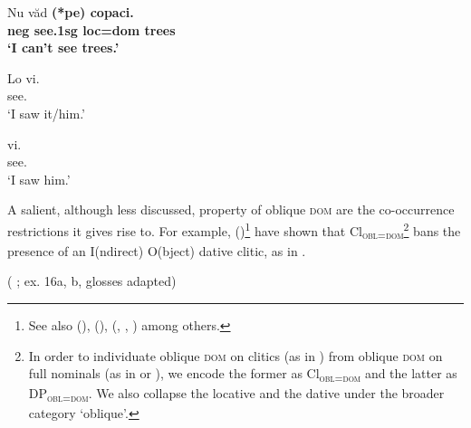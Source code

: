 \documentclass[output=paper,colorlinks,citecolor=brown,draft,draftmode]{langscibook}
\begin{document}
\ea \label{ex:irimia:RomanianNoDOM}
\gll Nu v\u ad \bf {(*pe)} copaci. \\
{\sc neg} see.{\sc 1sg} {\sc loc=dom} trees \\ 
\glt `I can't see trees.'
\z


\ea \label{ex:irimia:LeistaSpanishCliticnoDOM}
\gll Lo vi.\\
 see.\\
\glt `I saw it/him.'
\z


\ea \label{ex:irimia:LeistaSpanishCliticDOM}
\gll {} vi. \\
 see. \\ 
\glt `I saw him.'
\z

A salient, although less discussed, property of oblique \textsc{dom} are the co-occur\-rence restrictions it gives rise to. For example, \citeauthor{ormromero07} (\citeyear{ormromero07})\footnote{See also \citeauthor{bleam} (\citeyear{bleam}), \citeauthor{zdrojewski} (\citeyear{zdrojewski}), \citeauthor{ormromero13} (\citeyear{ormromero13}, \citeyear{OrmRomero2013c}, \citeyear{OrmRomero2013b}) among others.} have shown that Cl\textsubscript{\textsc{obl=dom}}\footnote{In order to individuate oblique \textsc{dom} on clitics (as in ) from oblique \textsc{dom} on full nominals (as in  or ), we encode the former as Cl\textsubscript{\textsc{obl=dom}} and the latter as DP\textsubscript{\textsc{obl=dom}}. We also collapse the locative and the dative under the broader category `oblique'.} bans the presence of an I(ndirect) O(bject) dative clitic, as in .


 (\citeauthor{ormromero07} \citeyear{ormromero07}; ex. 16a, b, glosses adapted) \label{ex:irimia:LeistaSpanishCliticnoDOMnoPCC}
\z
\z
\end{document}
